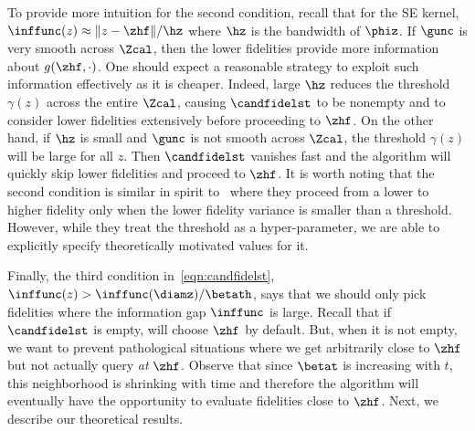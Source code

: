 To provide more intuition for the second condition,
recall that for the SE kernel, $\inffunc(z) \approx \|z-\zhf\|/\hz$ where $\hz$ is the
bandwidth of $\phiz$.
If $\gunc$ is very smooth across $\Zcal$, then the lower fidelities provide more
information about $g(\zhf,\cdot)$.
One should expect a reasonable strategy
to exploit such information effectively as it is cheaper.
Indeed, large $\hz$ reduces the threshold $\gamma(z)$ across the
entire $\Zcal$, causing $\candfidelst$ to be nonempty and \mfgpucbtwos to
consider lower fidelities extensively before proceeding to $\zhf$.
On the other hand, if $\hz$ is small and $\gunc$ is not smooth across $\Zcal$, the
threshold $\gamma(z)$ will be large for all $z$. 
Then $\candfidelst$ vanishes fast and the algorithm will quickly 
skip lower fidelities and proceed to $\zhf$.
It is worth noting that the second condition is similar in
spirit to~\citet{kandasamy16mfbo} where they proceed from a lower to higher
fidelity only when the lower fidelity variance is smaller than a threshold.
However, while they treat the threshold as a hyper-parameter, we are able to explicitly
specify theoretically motivated values for it.


Finally, the third condition in~\eqref{eqn:candfidelst},
$\inffunc(z) > \inffunc(\diamz)/\betath$, 
says that we should only pick
fidelities where the information gap $\inffunc$ is large. 
Recall that if $\candfidelst$ is empty, \boca{} will choose $\zhf$ by default. But, when it is not empty, we want to prevent pathological situations where we get arbitrarily close to
$\zhf$ but not actually query \emph{at} $\zhf$.
Observe that since $\betat$ is increasing with $t$, this neighborhood is shrinking with time
and therefore the algorithm will eventually have the opportunity to evaluate fidelities
close to $\zhf$.
Next, we describe our theoretical results.







